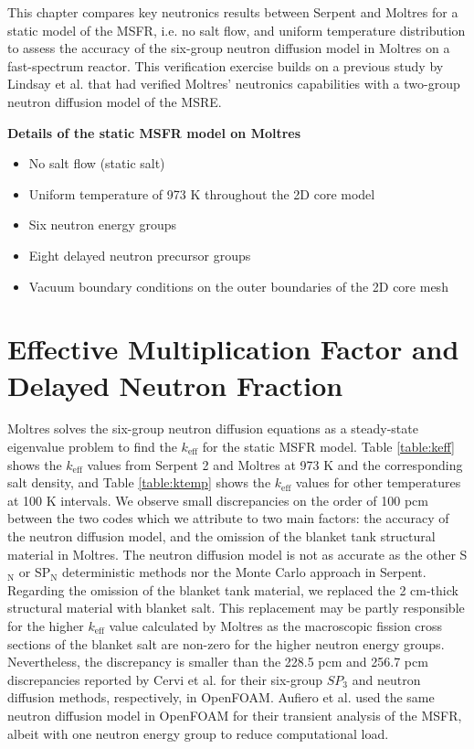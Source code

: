 This chapter compares key neutronics results between Serpent and Moltres
for a static model of the \gls{MSFR}, i.e. no salt flow, and uniform
temperature distribution to assess the accuracy of the
six-group neutron diffusion model in Moltres on a fast-spectrum reactor. This
verification exercise builds on a previous study by Lindsay et al.
\cite{lindsay_introduction_2018} that had verified Moltres' neutronics
capabilities with a two-group neutron diffusion model of the \gls{MSRE}.

\textbf{Details of the static \gls{MSFR} model on Moltres}
\begin{itemize}
    \item No salt flow (static salt)
    \item Uniform temperature of 973 K throughout the 2D core model
    \item Six neutron energy groups
    \item Eight delayed neutron precursor groups
    \item Vacuum boundary conditions on the outer boundaries of the 2D core
    mesh
\end{itemize}

\section{Effective Multiplication Factor and Delayed Neutron Fraction}

Moltres solves the six-group neutron diffusion equations as a
steady-state eigenvalue problem to find the $k_{\text{eff}}$ for the static
\gls{MSFR} model. Table
\ref{table:keff} shows the $k_{\text{eff}}$ values from Serpent 2 and Moltres
at 973 K and the corresponding salt density, and Table \ref{table:ktemp} shows
the $k_{\text{eff}}$ values for other temperatures at 100 K intervals. We
observe small discrepancies on the order of 100 pcm between the two codes
which we attribute to two main factors: the accuracy of the neutron diffusion
model, and the omission of the blanket tank structural material in Moltres.
The neutron diffusion model is not as accurate as the other S$_{\text{N}}$ or
SP$_{\text{N}}$ deterministic methods nor the Monte Carlo approach in Serpent.
Regarding the omission of the blanket tank material, we replaced the
2 cm-thick structural material with blanket salt. This replacement may be
partly responsible for the higher $k_{\text{eff}}$ value calculated by Moltres
as the macroscopic fission cross sections of the blanket salt are non-zero for
the higher neutron energy groups. Nevertheless, the discrepancy is smaller
than the 228.5 pcm and 256.7 pcm discrepancies reported by Cervi et al.
\cite{cervi_development_2019} for their six-group $SP_3$ and neutron
diffusion methods, respectively, in OpenFOAM. Aufiero et al.
\cite{aufiero_development_2014} used the same neutron diffusion model in
OpenFOAM for their transient analysis of the \gls{MSFR}, albeit with one
neutron energy group to reduce computational load.

